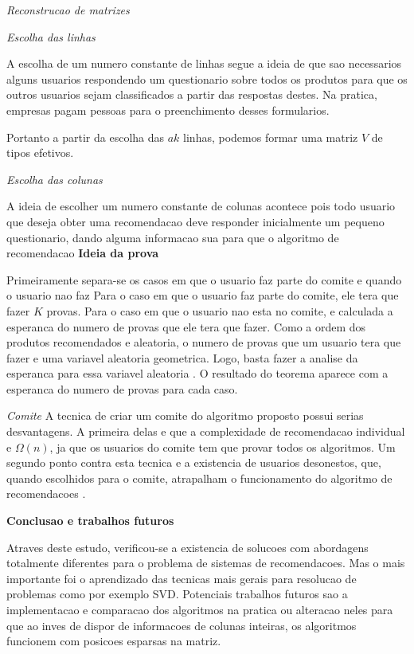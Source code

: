 \documentclass[a4paper,10pt]{article}
\begin{document}
\textit{Reconstrucao de matrizes}

\textit{Escolha das linhas}

A escolha de um numero constante de linhas segue a ideia de que sao necessarios
alguns usuarios respondendo um questionario sobre todos os produtos para que os
outros usuarios sejam classificados a partir das respostas destes. Na pratica, empresas
pagam pessoas para o preenchimento desses formularios.

Portanto a partir da escolha das $ak$ linhas, podemos formar uma matriz $V$ de tipos efetivos.

\textit{Escolha das colunas}

A ideia de escolher um numero constante de colunas acontece pois todo usuario
que deseja obter uma recomendacao deve responder inicialmente um pequeno 
questionario, dando alguma informacao sua para que o algoritmo de recomendacao
\textbf{Ideia da prova}

Primeiramente separa-se os casos em que o usuario faz parte do comite e quando
o usuario nao faz 
Para o caso em que o usuario faz parte do comite, ele tera que fazer $K$ provas.
Para o caso em que o usuario nao esta no comite, e calculada a esperanca do numero 
de provas que ele tera que fazer. Como a ordem dos produtos
recomendados e aleatoria, o numero de provas que um usuario tera que fazer
e uma variavel aleatoria geometrica. Logo, basta fazer a analise da esperanca
para essa variavel aleatoria \cite{MG}.
O resultado do teorema aparece com a esperanca do numero de provas para
cada caso.

\textit{Comite}
A tecnica de criar um comite do algoritmo proposto possui serias
desvantagens. 
A primeira delas e que a complexidade de recomendacao individual
e $\Omega(n)$, ja que os usuarios do comite tem que provar todos os
algoritmos. 
Um segundo ponto contra esta tecnica e a existencia de usuarios desonestos,
que, quando escolhidos para o comite, atrapalham o funcionamento do 
algoritmo de recomendacoes \cite{Boney96}.

\textbf{Conclusao e trabalhos futuros}

Atraves deste estudo, verificou-se a existencia de solucoes com abordagens
totalmente diferentes para o problema de sistemas de recomendacoes. Mas o mais
importante foi o aprendizado das tecnicas mais gerais para resolucao de problemas
como por exemplo SVD. 
Potenciais trabalhos futuros sao a implementacao e comparacao dos algoritmos na pratica
ou alteracao neles para que ao inves de dispor de informacoes de colunas inteiras, os
algoritmos funcionem com posicoes esparsas na matriz. 
\end{document}
